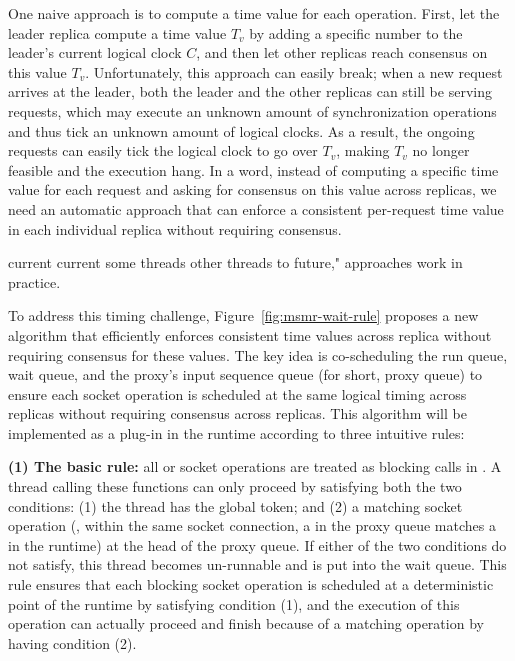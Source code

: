 One naive approach is to compute a time value for each operation. First, let the
leader replica compute a time value $T_{v}$ by adding a specific number to the
leader's current logical clock $C$, and then let other replicas reach consensus
on this value $T_{v}$. Unfortunately, this approach can easily break; when a new
request arrives at the leader, both the leader and the other replicas can still
be serving requests, which may execute an unknown amount of synchronization
operations and thus tick an unknown amount of logical clocks. As a result, the
ongoing requests can easily tick the logical clock to go over $T_{v}$, making
$T_{v}$ no longer feasible and the execution hang. In a word, instead of
computing a specific time value for each request and asking for consensus on
this value across replicas, we need an automatic approach that can enforce a
consistent per-request time value in each individual replica without requiring
consensus.


current %
current %
some threads %
other threads to %
future," approaches %
work in practice.

To address this timing challenge, Figure~\ref{fig:msmr-wait-rule} proposes a new
algorithm that efficiently enforces consistent time values across replica
without requiring consensus for these values. The key idea is co-scheduling the
\parrot run queue, wait queue, and the proxy's input sequence queue (for short,
proxy queue) to ensure each socket operation is scheduled at the same logical
timing across replicas without requiring consensus across replicas. This
algorithm will be implemented as a plug-in in the \parrot runtime according to
three intuitive rules:

\textbf{(1) The basic rule:} all \recv or \select socket operations are treated
as blocking calls in \parrot. A thread calling these functions can only proceed
by satisfying both the two conditions: (1) the thread has the \parrot global
token; and (2) a matching socket operation (\eg, within the same socket
connection, a \send in the proxy queue matches a \recv in the \parrot runtime)
at the head of the proxy queue. If either of the two conditions do not satisfy,
this thread becomes un-runnable and is put into the \parrot wait queue. This
rule ensures that each blocking socket operation is scheduled at a deterministic
point of the \parrot runtime by satisfying condition (1), and the execution of
this operation can actually proceed and finish because of a matching operation by
having condition (2).

